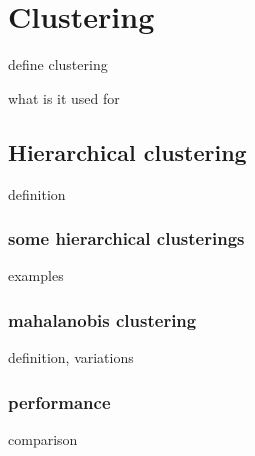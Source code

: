 \chapter{Clustering}

define clustering

what is it used for

\section{Hierarchical clustering}

definition 

\subsection{some hierarchical clusterings}

examples

\subsection{mahalanobis clustering}

definition, variations

\subsection{performance}

comparison